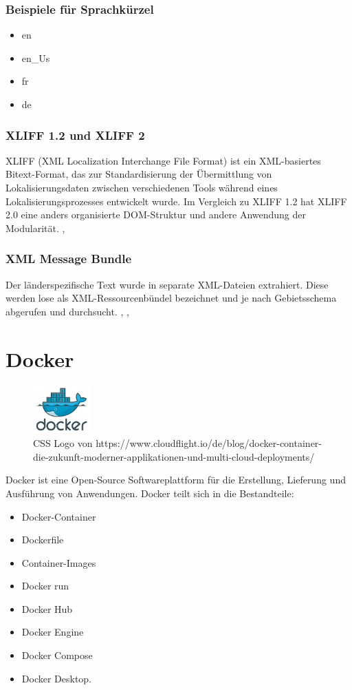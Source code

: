 \subsubsection{Beispiele für Sprachkürzel}
\begin{itemize}
  \item en
  \item en\_Us
  \item fr
  \item de
\end{itemize}

\subsubsection{XLIFF 1.2 und XLIFF 2}
XLIFF (XML Localization Interchange File Format) ist ein XML-basiertes Bitext-Format, das zur 
Standardisierung der Übermittlung von Lokalisierungsdaten zwischen verschiedenen Tools während 
eines Lokalisierungsprozesses entwickelt wurde.
Im Vergleich zu XLIFF 1.2 hat XLIFF 2.0 eine anders organisierte DOM-Struktur und andere
Anwendung der Modularität. \cite{noauthor_xliff_2022}, \cite{noauthor_xliff-dateien_nodate}

\subsubsection{XML Message Bundle}
Der länderspezifische Text wurde in separate XML-Dateien extrahiert. 
Diese werden lose als XML-Ressourcenbündel bezeichnet und je nach Gebietsschema abgerufen und 
durchsucht. \cite{noauthor_xml_nodate}, \cite{noauthor_message_nodate}, \cite{noauthor_xml_nodate-1}

\section{Docker}
\begin{figure}[H]
  \includegraphics[width=0.2\textwidth]{pics/Docker_Logo.png}
  \centering
  \caption{CSS Logo von https://www.cloudflight.io/de/blog/docker-container-die-zukunft-moderner-applikationen-und-multi-cloud-deployments/}
\end{figure}
Docker ist eine Open-Source Softwareplattform für die Erstellung, Lieferung und Ausführung von Anwendungen. \cite{noauthor_home_nodate}
Docker teilt sich in die Bestandteile: 
\begin{itemize}
  \item Docker-Container
  \item Dockerfile
  \item Container-Images
  \item Docker run
  \item Docker Hub
  \item Docker Engine
  \item Docker Compose
  \item Docker Desktop.
\end{itemize}

